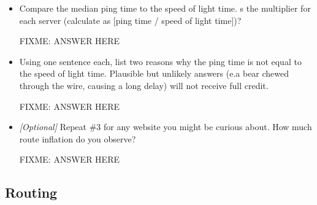\documentclass[10pt]{article}
\begin{document}
\begin{enumerate}
\begin{itemize}

\item Compare the median ping time to the speed of light time. s the multiplier for each server (calculate as [ping time / speed of light time])?

FIXME: ANSWER HERE

\item Using one sentence each, list two reasons why the ping time is not equal to the speed of light time. Plausible but unlikely answers (e.a bear chewed through the wire, causing a long delay) will not receive full credit.

FIXME: ANSWER HERE

\item \emph{[Optional]} Repeat \#3 for any website you might be curious about. How much route inflation do you observe? 

FIXME: ANSWER HERE

\end{itemize}
\end{enumerate}


\newpage
\subsection*{Routing}
\end{document}
